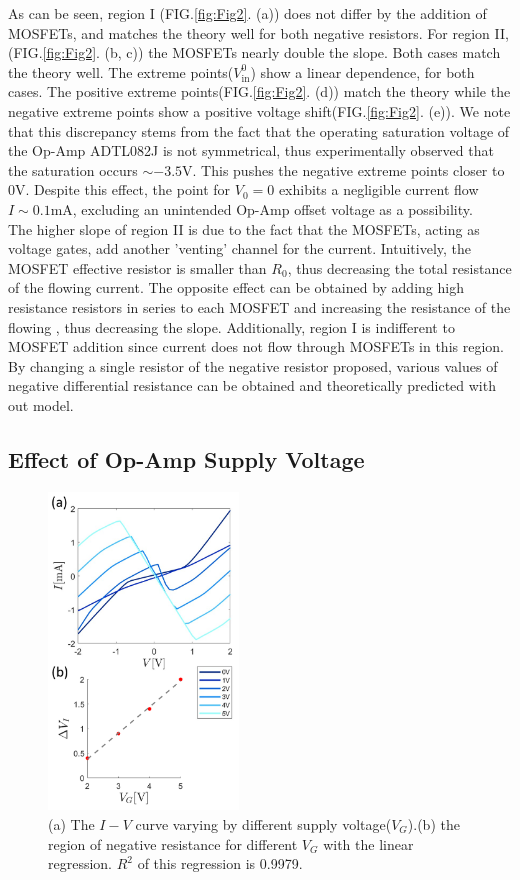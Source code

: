 \documentclass[%
 aip,
amsmath,amssymb,
reprint,
]{revtex4-1}
\begin{document}
As can be seen, region I (FIG.\ref{fig:Fig2}. (a)) does not differ by the addition of MOSFETs, and matches the theory well for both negative resistors. For region II, (FIG.\ref{fig:Fig2}. (b, c)) the MOSFETs nearly double the slope. Both cases match the theory well. The extreme points($V_\text{in}^0$) show a linear dependence, for both cases. The positive extreme points(FIG.\ref{fig:Fig2}. (d)) match the theory while the negative extreme points show a positive voltage shift(FIG.\ref{fig:Fig2}. (e)). We note that this discrepancy stems from the fact that the operating saturation voltage of the Op-Amp ADTL082J is not symmetrical, thus experimentally observed that the saturation occurs $\sim-3.5$V. This pushes the negative extreme points closer to $0$V. Despite this effect, the point for $V_0=0$ exhibits a negligible current flow $I\sim0.1$mA, excluding an unintended Op-Amp offset voltage as a possibility. \\

The higher slope of region II is due to the fact that the MOSFETs, acting as voltage gates, add another 'venting' channel for the current. Intuitively, the MOSFET effective resistor is smaller than $R_0$, thus decreasing the total resistance of the flowing current. The opposite effect can be obtained by adding high resistance resistors in series to each MOSFET and increasing the resistance of the flowing , thus decreasing the slope. Additionally, region I is indifferent to MOSFET addition since current does not flow through MOSFETs in this region. By changing a single resistor of the negative resistor proposed, various values of negative differential resistance can be obtained and theoretically predicted with out model. 

\subsection{Effect of Op-Amp Supply Voltage}
\begin{figure}[!h]
  \includegraphics[width=0.45\textwidth]{figures/Fig3.png}
  \caption{(a) The $I-V$ curve varying by different supply voltage($V_G$).(b) the region of negative resistance for different $V_G$ with the linear regression. $R^2$ of this regression is 0.9979.}
  \label{fig:Fig3}
\end{figure}
\end{document}
